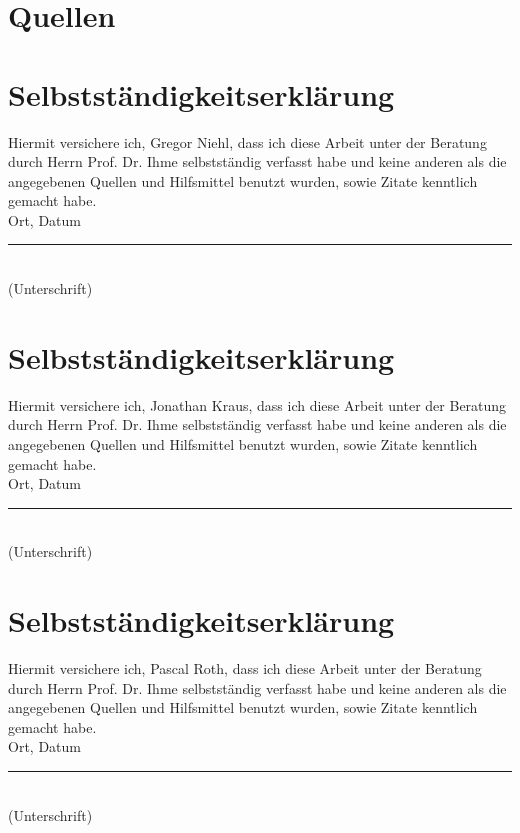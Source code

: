 \label{fig:architekturdiagramm}



\section*{Quellen}
\bib
\appendix

\newcommand{\selbststaendigkeitserklaerung}[1]{
	\newpage
	\section*{Selbstständigkeitserklärung}
	Hiermit versichere ich, {#1}, dass ich diese Arbeit unter der Beratung durch Herrn Prof. Dr. Ihme selbstständig verfasst habe und keine anderen als die angegebenen Quellen und Hilfsmittel benutzt wurden, sowie Zitate kenntlich gemacht habe. \\[2cm]

	Ort, Datum \hfill \rule{5cm}{0.4pt} \\
	\hfill (Unterschrift)
}

\selbststaendigkeitserklaerung{Gregor Niehl}
\selbststaendigkeitserklaerung{Jonathan Kraus}
\selbststaendigkeitserklaerung{Pascal Roth}
